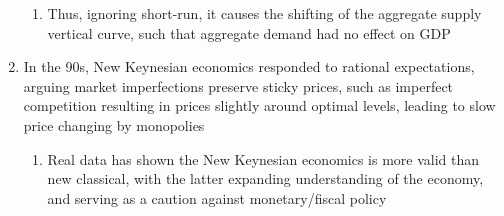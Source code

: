 \begin{enumerate}
\begin{enumerate}
\item Thus, ignoring short-run, it causes the shifting of the aggregate supply vertical curve, such that aggregate demand had no effect on GDP
\end{enumerate}
\item In the 90s, New Keynesian economics responded to rational expectations, arguing market imperfections preserve sticky prices, such as imperfect competition resulting in prices slightly around optimal levels, leading to slow price changing by monopolies
\begin{enumerate}
\item Real data has shown the New Keynesian economics is more valid than new classical, with the latter expanding understanding of the economy, and serving as a caution against monetary/fiscal policy
\end{enumerate}
\end{enumerate}
